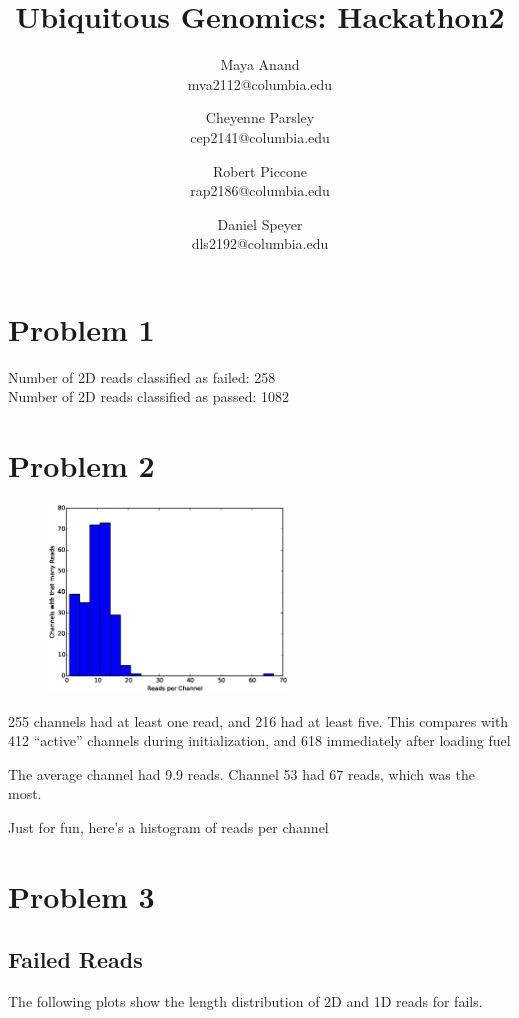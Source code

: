 \documentclass[11pt]{article}
\title{Ubiquitous Genomics: Hackathon2}
\author{
  Maya Anand\\ mva2112@columbia.edu \and
  Cheyenne Parsley\\ cep2141@columbia.edu \and
  Robert Piccone\\ rap2186@columbia.edu \and
  Daniel Speyer\\ dls2192@columbia.edu}
\begin{document}
\maketitle
\section*{Problem 1}
Number of 2D reads classified as failed: 258\\
Number of 2D reads classified as passed: 1082\\
\section*{Problem 2}
\begin{figure}
  \vspace{-20pt}
  \includegraphics[width=2.5in]{part2hist}
  \vspace{-20pt}
\end{figure}
255 channels had at least one read, and 216 had at least five.  
This compares with 412 ``active'' channels during initialization, and 618 immediately after loading fuel

The average channel had 9.9 reads. 
Channel 53 had 67 reads, which was the most.

Just for fun, here's a histogram of reads per channel\\
\newpage
\section*{Problem 3}
\subsection*{Failed Reads}

        The following plots show the length distribution of 2D and 1D reads for fails.
       
\end{document}
